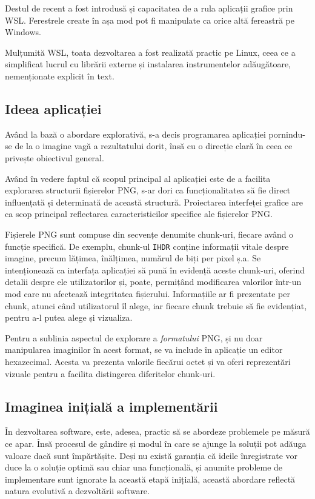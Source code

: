 \documentclass[a4paper,12pt]{report}
\begin{document}
Destul de recent a fost introdusă și capacitatea de a rula aplicații grafice prin \ac{WSL}.
Ferestrele create în așa mod pot fi manipulate ca orice altă fereastră pe Windows.

Mulțumită \ac{WSL}, toata dezvoltarea a fost realizată practic pe Linux, 
ceea ce a simplificat lucrul cu librării externe și instalarea instrumentelor adăugătoare, nemenționate explicit în text.

\subsection{Ideea aplicației}

Având la bază o abordare explorativă, s-a decis programarea aplicației
pornindu-se de la o imagine vagă a rezultatului dorit,
însă cu o direcție clară în ceea ce privește obiectivul general.

Având în vedere faptul că scopul principal al aplicației
este de a facilita explorarea structurii fișierelor \ac{PNG},
s-ar dori ca funcționalitatea să fie direct
influențată și determinată de această structură.
Proiectarea interfeței grafice are ca scop principal reflectarea
caracteristicilor specifice ale fișierelor \ac{PNG}.

Fișierele \ac{PNG} sunt compuse din secvențe denumite chunk-uri,
fiecare având o funcție specifică.
De exemplu, chunk-ul \texttt{IHDR} conține informații vitale despre imagine,
precum lățimea, înălțimea, numărul de biți per pixel ș.a.
Se intenționează ca interfața aplicației să pună
în evidență aceste chunk-uri, oferind detalii despre ele utilizatorilor
și, poate, permițând modificarea valorilor într-un mod
care nu afectează integritatea fișierului.
Informațiile ar fi prezentate per chunk, atunci când utilizatorul îl alege,
iar fiecare chunk trebuie să fie evidențiat, pentru a-l putea alege și vizualiza.

Pentru a sublinia aspectul de explorare a \textit{formatului} \ac{PNG},
și nu doar manipularea imaginilor în acest format,
se va include în aplicație un editor hexazecimal.
Acesta va prezenta valorile fiecărui octet și
va oferi reprezentări vizuale pentru a facilita distingerea diferitelor chunk-uri.

\subsection{Imaginea inițială a implementării}

În dezvoltarea software, este, adesea, practic să se abordeze problemele pe măsură ce apar.
Însă procesul de gândire și modul în care se ajunge la soluții
pot adăuga valoare dacă sunt împărtășite.
Deși nu există garanția că ideile înregistrate vor duce
la o soluție optimă sau chiar una funcțională,
și anumite probleme de implementare sunt ignorate la această etapă inițială,
această abordare reflectă natura evolutivă a dezvoltării software.
\end{document}
